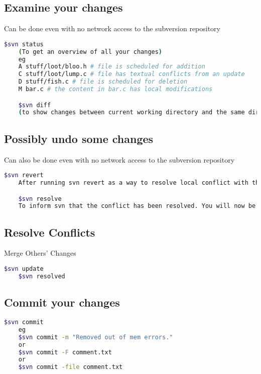 \documentclass{article}
\begin{document}
\subsection{Examine your changes}
Can be done even with no network access to the subversion repository
\begin{lstlisting}[language=BASH]
    $svn status
    (To get an overview of all your changes)
    eg
    A stuff/loot/bloo.h # file is scheduled for addition
    C stuff/loot/lump.c # file has textual conflicts from an update
    D stuff/fish.c # file is scheduled for deletion
    M bar.c # the content in bar.c has local modifications

    $svn diff
    (to show changes between current working directory and the same directory in the repository) 
\end{lstlisting}

\subsection{Possibly undo some changes}
Can also be done even with no network access to the subversion repository
\begin{lstlisting}[language=BASH]
    $svn revert
    After running svn revert as a way to resolve local conflict with the repository copy, Run:

    $svn resolve
    To inform svn that the conflict has been resolved. You will now be able to successfully run svn update in case of previous conflicts. 
\end{lstlisting}

\subsection{Resolve Conflicts}
Merge Others' Changes
\begin{lstlisting}[language=BASH]
    $svn update
    $svn resolved 
\end{lstlisting}

\subsection{Commit your changes}
\begin{lstlisting}[language=BASH]
    $svn commit
    eg
    $svn commit -m "Removed out of mem errors."
    or
    $svn commit -F comment.txt
    or
    $svn commit -file comment.txt 
\end{lstlisting}
\end{document}
